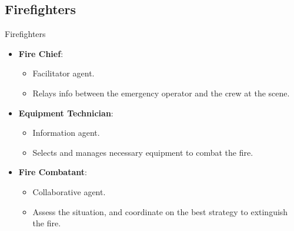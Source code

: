 \subsection{Firefighters}
\begin{frame}{Firefighters}
    \begin{itemize}
        \item \textbf{Fire Chief}:
        \begin{itemize}
            \item \alert{Facilitator} agent.
            \item \alert{Relays info} between the emergency operator and the crew at the scene.
        \end{itemize}
        \item \textbf{Equipment Technician}:
        \begin{itemize}
            \item \alert{Information} agent.
            \item Selects and \alert{manages} necessary \alert{equipment} to combat the fire.
        \end{itemize}
        \item \textbf{Fire Combatant}:
        \begin{itemize}
            \item \alert{Collaborative} agent.
            \item \alert{Assess} the situation, and \alert{coordinate} on the best strategy to extinguish the fire.
        \end{itemize}
    \end{itemize}
\end{frame} 